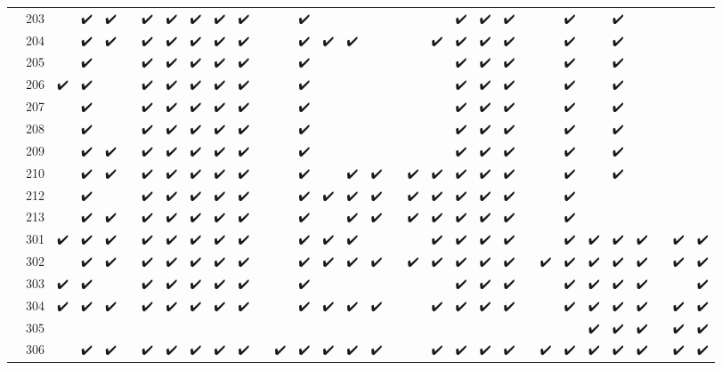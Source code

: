 \begin{tabular}{llcccccccccccccccccccccccccccccc}
 & 203 &  & ✔️ & ✔️ &  & ✔️ & ✔️ & ✔️ & ✔️ & ✔️ &  &  & ✔️ &  &  &  &  &  &  & ✔️ & ✔️ & ✔️ &  &  & ✔️ &  & ✔️ &  &  &  &  \\
 & 204 &  & ✔️ & ✔️ &  & ✔️ & ✔️ & ✔️ & ✔️ & ✔️ &  &  & ✔️ & ✔️ & ✔️ &  &  &  & ✔️ & ✔️ & ✔️ & ✔️ &  &  & ✔️ &  & ✔️ &  &  &  &  \\
 & 205 &  & ✔️ &  &  & ✔️ & ✔️ & ✔️ & ✔️ & ✔️ &  &  & ✔️ &  &  &  &  &  &  & ✔️ & ✔️ & ✔️ &  &  & ✔️ &  & ✔️ &  &  &  &  \\
 & 206 & ✔️ & ✔️ &  &  & ✔️ & ✔️ & ✔️ & ✔️ & ✔️ &  &  & ✔️ &  &  &  &  &  &  & ✔️ & ✔️ & ✔️ &  &  & ✔️ &  & ✔️ &  &  &  &  \\
 & 207 &  & ✔️ &  &  & ✔️ & ✔️ & ✔️ & ✔️ & ✔️ &  &  & ✔️ &  &  &  &  &  &  & ✔️ & ✔️ & ✔️ &  &  & ✔️ &  & ✔️ &  &  &  &  \\
 & 208 &  & ✔️ &  &  & ✔️ & ✔️ & ✔️ & ✔️ & ✔️ &  &  & ✔️ &  &  &  &  &  &  & ✔️ & ✔️ & ✔️ &  &  & ✔️ &  & ✔️ &  &  &  &  \\
 & 209 &  & ✔️ & ✔️ &  & ✔️ & ✔️ & ✔️ & ✔️ & ✔️ &  &  & ✔️ &  &  &  &  &  &  & ✔️ & ✔️ & ✔️ &  &  & ✔️ &  & ✔️ &  &  &  &  \\
 & 210 &  & ✔️ & ✔️ &  & ✔️ & ✔️ & ✔️ & ✔️ & ✔️ &  &  & ✔️ &  & ✔️ & ✔️ &  & ✔️ & ✔️ & ✔️ & ✔️ & ✔️ &  &  & ✔️ &  & ✔️ &  &  &  &  \\
 & 212 &  & ✔️ &  &  & ✔️ & ✔️ & ✔️ & ✔️ & ✔️ &  &  & ✔️ & ✔️ & ✔️ & ✔️ &  & ✔️ & ✔️ & ✔️ & ✔️ & ✔️ &  &  & ✔️ &  &  &  &  &  &  \\
 & 213 &  & ✔️ & ✔️ &  & ✔️ & ✔️ & ✔️ & ✔️ & ✔️ &  &  & ✔️ &  & ✔️ & ✔️ &  & ✔️ & ✔️ & ✔️ & ✔️ & ✔️ &  &  & ✔️ &  &  &  &  &  &  \\
 & 301 & ✔️ & ✔️ & ✔️ &  & ✔️ & ✔️ & ✔️ & ✔️ & ✔️ &  &  & ✔️ & ✔️ & ✔️ &  &  &  & ✔️ & ✔️ & ✔️ & ✔️ &  &  & ✔️ & ✔️ & ✔️ & ✔️ &  & ✔️ & ✔️ \\
 & 302 &  & ✔️ & ✔️ &  & ✔️ & ✔️ & ✔️ & ✔️ & ✔️ &  &  & ✔️ & ✔️ & ✔️ & ✔️ &  & ✔️ & ✔️ & ✔️ & ✔️ & ✔️ &  & ✔️ & ✔️ & ✔️ & ✔️ & ✔️ &  & ✔️ & ✔️ \\
 & 303 & ✔️ & ✔️ &  &  & ✔️ & ✔️ & ✔️ & ✔️ & ✔️ &  &  & ✔️ &  &  &  &  &  &  & ✔️ & ✔️ & ✔️ &  &  & ✔️ & ✔️ & ✔️ & ✔️ &  &  & ✔️ \\
 & 304 & ✔️ & ✔️ & ✔️ &  & ✔️ & ✔️ & ✔️ & ✔️ & ✔️ &  &  & ✔️ & ✔️ & ✔️ & ✔️ &  &  & ✔️ & ✔️ & ✔️ & ✔️ &  &  & ✔️ & ✔️ & ✔️ & ✔️ &  & ✔️ & ✔️ \\
 & 305 &  &  &  &  &  &  &  &  &  &  &  &  &  &  &  &  &  &  &  &  &  &  &  &  & ✔️ & ✔️ & ✔️ &  & ✔️ & ✔️ \\
 & 306 &  & ✔️ & ✔️ &  & ✔️ & ✔️ & ✔️ & ✔️ & ✔️ &  & ✔️ & ✔️ & ✔️ & ✔️ & ✔️ &  &  & ✔️ & ✔️ & ✔️ & ✔️ &  & ✔️ & ✔️ & ✔️ & ✔️ & ✔️ &  & ✔️ & ✔️ \\

\end{tabular}
